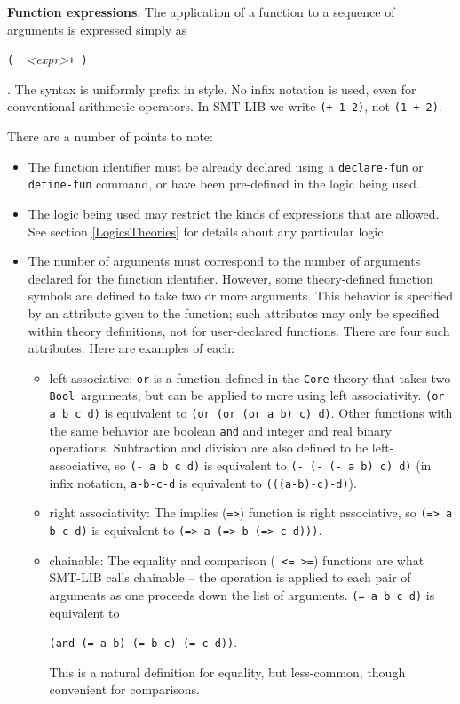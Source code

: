 \documentclass[12pt,oneside]{report}
\newcommand{\Bool}{{\tt Bool}}
\begin{document}
{\bf Function expressions}.
The application of a function to a sequence of arguments is expressed simply as\\
\centerline{{\tt ( }{\it <qualified-identifier>~<expr>}{\tt+ )}}.
The syntax is uniformly prefix in style. No infix notation is used, even for conventional arithmetic operators.  In SMT-LIB we write 
{\tt (+ 1 2)}, not {\tt (1 + 2)}.

There are a number of points to note:
\begin{itemize}
\item The function identifier must be already declared using a {\tt declare-fun} or {\tt define-fun} command, or have been
pre-defined in the logic being used.
\item The logic being used may restrict the kinds of expressions that are allowed.  See section \ref{LogicsTheories} for details about any particular logic.
\item The number of arguments must correspond to the number of arguments declared for the function identifier.  However, some theory-defined function symbols are defined to take two or more arguments.  This behavior is specified by an attribute given to the function; such attributes may only be specified within theory definitions, not for user-declared functions.  There are four such attributes.  Here are examples of each:
\begin{itemize}
\item left associative: {\tt or} is a function defined in the {\tt Core} theory that takes two \Bool~arguments, but can be applied to more using left associativity. {\tt (or a b c d)} is equivalent to {\tt (or (or (or a b) c) d)}. Other functions with the same behavior are boolean 
{\tt and} and integer and real binary operations. Subtraction and division are also defined to be left-associative, so 
{\tt (- a b c d)} is equivalent to {\tt (- (- (- a b) c) d)} (in infix notation, {\tt a-b-c-d} is equivalent to {\tt (((a-b)-c)-d)}).
\item right associativity: The implies ({\tt =>}) function is right associative, so {\tt (=> a b c d)} is equivalent to {\tt (=> a (=> b (=> c d)))}.
\item chainable: The equality and comparison ({\tt < > <= >=}) functions are what SMT-LIB calls chainable -- the operation is applied to each pair of arguments as one proceeds down the list of arguments.  {\tt (= a b c d)} is equivalent to \\
\centerline{{\tt (and (= a b) (= b c) (= c d))}.}
This is a natural definition for equality, but less-common, though convenient for comparisons.

\end{itemize}
\end{itemize}
\end{document}

